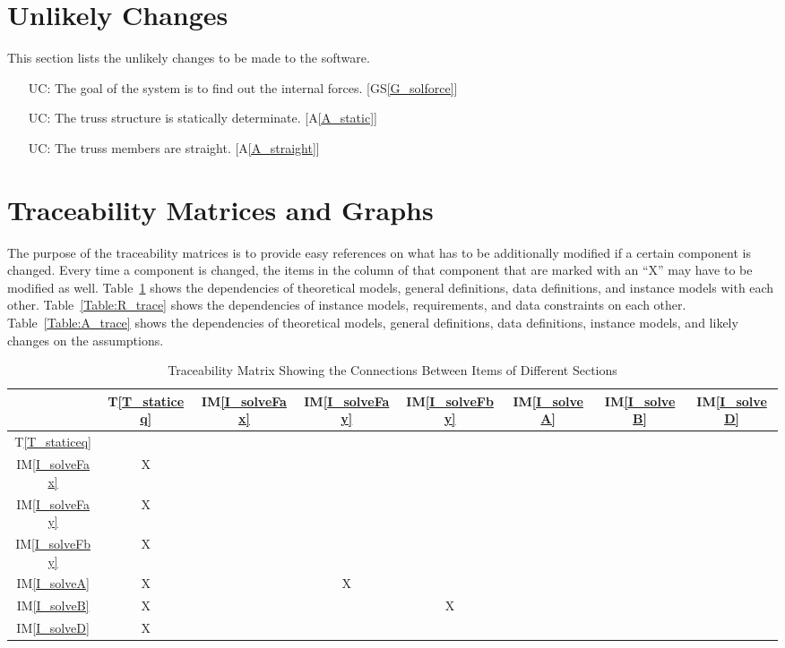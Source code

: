 \documentclass[12pt]{article}
\newcommand{\tref}[1]{T\ref{#1}}
\newcommand{\aref}[1]{A\ref{#1}}
\newcommand{\gsref}[1]{GS\ref{#1}}
\newcommand{\iref}[1]{IM\ref{#1}}
\newcounter{ucnum} %
\begin{document}
\section{Unlikely Changes}    
This section lists the unlikely changes to be made to the software.
\noindent \begin{itemize}

\item[UC\refstepcounter{ucnum}\theucnum\label{UC_sysgoal}:] The goal of the 
system is to find out the internal forces. [\gsref{G_solforce}]

\item[UC\refstepcounter{ucnum}\theucnum\label{UC_static}:] The truss structure 
is statically determinate. [\aref{A_static}]

\item[UC\refstepcounter{ucnum}\theucnum\label{UC_straight}:] The truss members 
are straight. [\aref{A_straight}]

\end{itemize}

\section{Traceability Matrices and Graphs}

The purpose of the traceability matrices is to provide easy references on what
has to be additionally modified if a certain component is changed. Every time a
component is changed, the items in the column of that component that are marked
with an ``X'' may have to be modified as well. Table~\ref{Table:trace} shows 
the dependencies of theoretical models, general definitions, data definitions, 
and instance models  with each other. Table~\ref{Table:R_trace} shows the
dependencies of instance models, requirements, and data constraints on each
other. Table~\ref{Table:A_trace} shows the dependencies of theoretical models,
general definitions, data definitions, instance models, and likely changes on
the assumptions.

\begin{table}[h!]
\centering
\begin{tabular}{|c|c|c|c|c|c|c|c|}
\hline        
	& \tref{T_staticeq}& \iref{I_solveFax}& \iref{I_solveFay}& 
	\iref{I_solveFby} & \iref{I_solveA}& \iref{I_solveB}& \iref{I_solveD} \\
\hline
\tref{T_staticeq} & & & & & & & \\ \hline
\iref{I_solveFax} &X & & & & & & \\ \hline
\iref{I_solveFay} &X & & & & & & \\ \hline
\iref{I_solveFby} &X & & & & & & \\ \hline
\iref{I_solveA}   &X & &X & & & & \\ \hline
\iref{I_solveB}   &X & & &X & & & \\ \hline
\iref{I_solveD}   &X & & & & & & \\ \hline
\end{tabular}
\caption{Traceability Matrix Showing the Connections Between Items of Different Sections}
\label{Table:trace}
\end{table}
\end{document}
